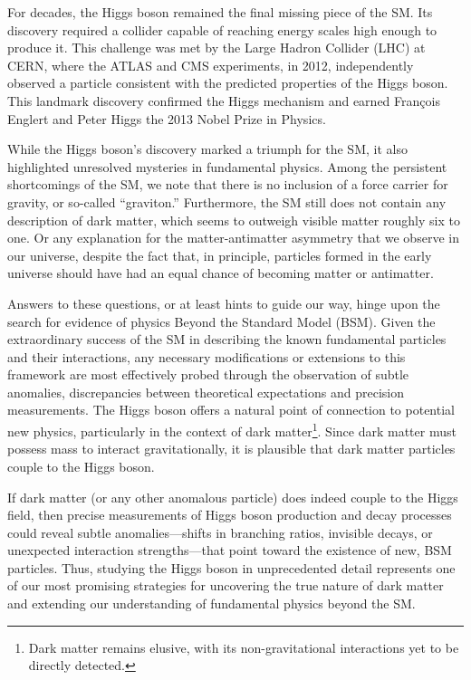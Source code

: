 For decades, the Higgs boson remained the final missing piece of the SM. Its discovery required a collider capable of reaching energy scales high enough to produce it. This challenge was met by the Large Hadron Collider (LHC) at CERN, where the ATLAS and CMS experiments, in 2012, independently observed a particle consistent with the predicted properties of the Higgs boson. This landmark discovery confirmed the Higgs mechanism and earned François Englert and Peter Higgs the 2013 Nobel Prize in Physics.

While the Higgs boson’s discovery marked a triumph for the SM, it also highlighted unresolved mysteries in fundamental physics. Among the persistent shortcomings of the SM, we note that there is no inclusion of a force carrier for gravity, or so-called ``graviton.'' Furthermore, the SM still does not contain any description of dark matter, which seems to outweigh visible matter roughly six to one. Or any explanation for the matter-antimatter asymmetry that we observe in our universe, despite the fact that, in principle, particles formed in the early universe should have had an equal chance of becoming matter or antimatter.

Answers to these questions, or at least hints to guide our way, hinge upon the search for evidence of physics Beyond the Standard Model (BSM). Given the extraordinary success of the SM in describing the known fundamental particles and their interactions, any necessary modifications or extensions to this framework are most effectively probed through the observation of subtle anomalies, discrepancies between theoretical expectations and precision measurements. The Higgs boson offers a natural point of connection to potential new physics, particularly in the context of dark matter\footnote{Dark matter remains elusive, with its non-gravitational interactions yet to be directly detected.}. Since dark matter must possess mass to interact gravitationally, it is plausible that dark matter particles couple to the Higgs boson.

If dark matter (or any other anomalous particle) does indeed couple to the Higgs field, then precise measurements of Higgs boson production and decay processes could reveal subtle anomalies—shifts in branching ratios, invisible decays, or unexpected interaction strengths—that point toward the existence of new, BSM particles. Thus, studying the Higgs boson in unprecedented detail represents one of our most promising strategies for uncovering the true nature of dark matter and extending our understanding of fundamental physics beyond the SM.



